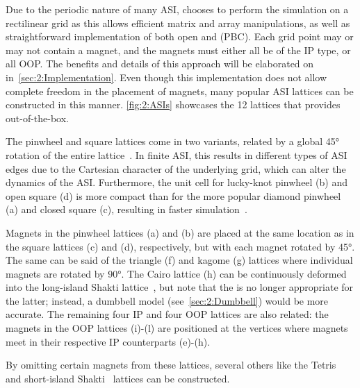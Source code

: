 Due to the periodic nature of many ASI, \hotspice chooses to perform the simulation on a rectilinear grid as this allows efficient matrix and array manipulations, as well as straightforward implementation of both open and  (PBC).
Each grid point may or may not contain a magnet, and the magnets must either all be of the IP type, or all OOP.
The benefits and details of this approach will be elaborated on in~\cref{sec:2:Implementation}.
Even though this implementation does not allow complete freedom in the placement of magnets, many popular ASI lattices can be constructed in this manner.
\cref{fig:2:ASIs} showcases the 12 lattices that \hotspice provides out-of-the-box. \par
The pinwheel and square lattices come in two variants, related by a global \ang{45} rotation of the entire lattice~\cite{ApparentFMpinwheel}.
In finite ASI, this results in different types of ASI edges due to the Cartesian character of the underlying grid, which can alter the dynamics of the ASI.
Furthermore, the unit cell for lucky-knot pinwheel (b) and open square (d) is more compact than for the more popular diamond pinwheel (a) and closed square (c), resulting in faster simulation~\cite{AdvancesASI}. \par %
Magnets in the pinwheel lattices (a) and (b) are placed at the same location as in the square lattices (c) and (d), respectively, but with each magnet rotated by \ang{45}.
The same can be said of the triangle (f) and kagome (g) lattices where individual magnets are rotated by \ang{90}.
The Cairo lattice (h) can be continuously deformed into the long-island Shakti lattice~\cite{ShaktiCairo,ShaktiCairoSquare}, but note that the  is no longer appropriate for the latter; instead, a dumbbell model (see~\cref{sec:2:Dumbbell}) would be more accurate.
The remaining four IP and four OOP lattices are also related: the magnets in the OOP lattices (i)-(l) are positioned at the vertices where magnets meet in their respective IP counterparts (e)-(h). \par
By omitting certain magnets from these lattices, several others like the Tetris~\cite{Saglam2022Tetris,nisoli2018topologytetris} and short-island Shakti~\cite{gilbert2014emergent} lattices can be constructed.


